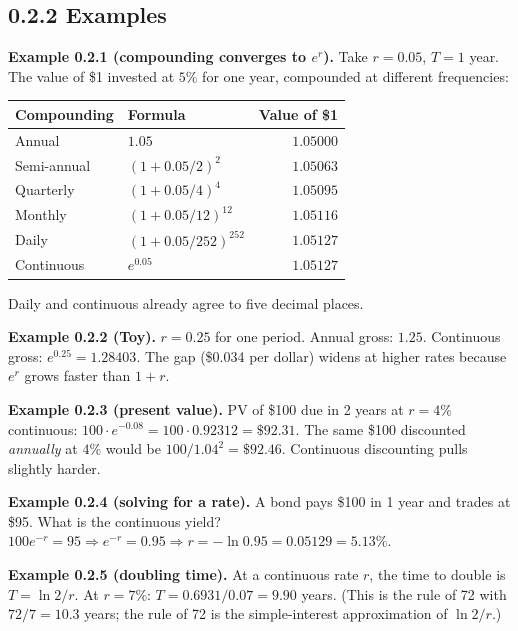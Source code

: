 \documentclass[
  10pt,
  twoside]{book}
\newcounter{none} %
\begin{document}
\subsection{0.2.2 Examples}\label{examples-1}

\textbf{Example 0.2.1 (compounding converges to \(e^r\)).} Take
\(r = 0.05\), \(T = 1\) year. The value of \$1 invested at \(5\%\) for
one year, compounded at different frequencies:

{\def\LTcaptype{none} %
\begin{table}[H]
\centering
\begin{tabular}{|l|l|r|}
\toprule
Compounding & Formula & Value of \$1 \\
\midrule



Annual & \(1.05\) & \(1.05000\) \\
Semi-annual & \((1 + 0.05/2)^2\) & \(1.05063\) \\
Quarterly & \((1 + 0.05/4)^4\) & \(1.05095\) \\
Monthly & \((1 + 0.05/12)^{12}\) & \(1.05116\) \\
Daily & \((1 + 0.05/252)^{252}\) & \(1.05127\) \\
Continuous & \(e^{0.05}\) & \(1.05127\) \\
\bottomrule
\end{tabular}
\end{table}
}

Daily and continuous already agree to five decimal places.

\textbf{Example 0.2.2 (Toy).} \(r = 0.25\) for one period. Annual gross:
\(1.25\). Continuous gross: \(e^{0.25} = 1.28403\). The gap (\$0.034 per
dollar) widens at higher rates because \(e^r\) grows faster than
\(1 + r\).

\textbf{Example 0.2.3 (present value).} PV of \$100 due in 2 years at
\(r = 4\%\) continuous:
\(100 \cdot e^{-0.08} = 100 \cdot 0.92312 = \$92.31\). The same \$100
discounted \emph{annually} at \(4\%\) would be
\(100 / 1.04^2 = \$92.46\). Continuous discounting pulls slightly
harder.

\textbf{Example 0.2.4 (solving for a rate).} A bond pays \$100 in 1 year
and trades at \$95. What is the continuous yield?
\(100 e^{-r} = 95 \Rightarrow e^{-r} = 0.95 \Rightarrow r = -\ln 0.95 = 0.05129 = 5.13\%\).

\textbf{Example 0.2.5 (doubling time).} At a continuous rate \(r\), the
time to double is \(T = \ln 2 / r\). At \(r = 7\%\):
\(T = 0.6931 / 0.07 = 9.90\) years. (This is the rule of 72 with
\(72/7 = 10.3\) years; the rule of 72 is the simple-interest
approximation of \(\ln 2 / r\).)
\end{document}
